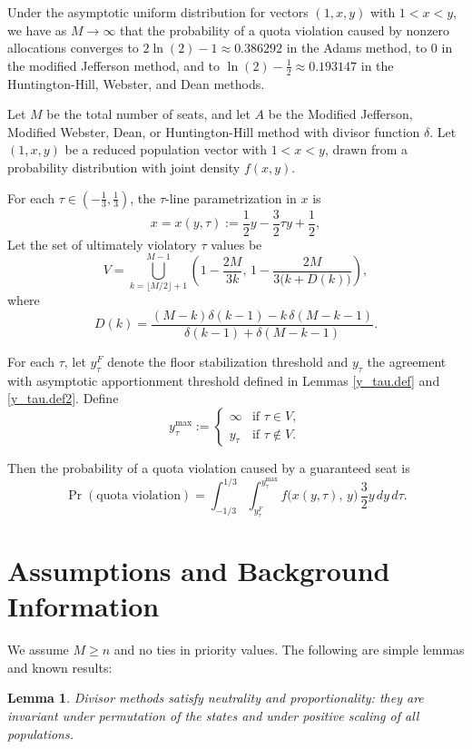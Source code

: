 \documentclass[11pt]{article}
\newtheorem{lemma}[theorem]{Lemma}
\theoremstyle{definition}
\theoremstyle{definition}
\newenvironment{customthm}[1]
  {\renewcommand\theinnercustomthm{#1}\innercustomthm}
  {\endinnercustomthm}
\begin{document}
\begin{customthm}{\ref{Mtoinftyproblimit}}
    Under the asymptotic uniform distribution for vectors $(1,x,y)$ with $1<x<y$, we have as $M \to \infty$ that the probability of a quota violation caused by nonzero allocations converges to $2 \ln(2) - 1 \approx 0.386292$ in the Adams method, to $0$ in the modified Jefferson method, and to $\ln(2) - \frac{1}{2} \approx 0.193147$ in the Huntington-Hill, Webster, and Dean methods.
\end{customthm}

\begin{customthm}{\ref{kitchen_sink}}
Let $M$ be the total number of seats, and let $A$ be the Modified Jefferson, Modified Webster, Dean, or Huntington-Hill method with divisor function $\delta$. Let $(1,x,y)$ be a reduced population vector with $1 < x < y$, drawn from a probability distribution with joint density $f(x,y)$.

For each $\tau \in \left(-\frac{1}{3},\frac{1}{3}\right)$, the $\tau$-line parametrization in $x$ is 
$$
x = x(y,\tau) := \frac{1}{2}y - \frac{3}{2}\tau y + \frac{1}{2},
$$
Let the set of ultimately violatory $\tau$ values be
$$
V = \bigcup_{k= \lfloor M/2 \rfloor + 1}^{M-1} 
\left( 1 - \frac{2M}{3k}, \, 1 - \frac{2M}{3\bigl(k + D(k)\bigr)} \right),
$$
where
$$
D(k) =\frac{(M-k)\delta(k-1)-k\,\delta(M-k-1)}{\delta(k-1)+\delta(M-k-1)}.
$$

For each $\tau$, let $y_\tau^F$ denote the floor stabilization threshold and $y_\tau$ the agreement with asymptotic apportionment threshold defined in Lemmas \ref{y_tau.def} and \ref{y_tau.def2}. Define
$$
y_\tau^{\max} :=
\begin{cases}
\infty & \text{if } \tau \in V,\\
y_\tau & \text{if } \tau \notin V.
\end{cases}
$$

Then the probability of a quota violation caused by a guaranteed seat is
$$
\Pr(\text{quota violation})
=
\int_{-1/3}^{1/3}
\int_{y_\tau^F}^{y_\tau^{\max}}
f\bigl(x(y,\tau),\,y\bigr)\,
\frac{3}{2}y
\, dy \, d\tau.
$$
\end{customthm}




\section{Assumptions and Background Information}
We assume $M \geq n$ and no ties in priority values. The following are simple lemmas and known results:
\begin{lemma}\parencite{b-young_textbook}\label{neutrality} Divisor methods satisfy neutrality and proportionality: they are invariant under permutation of the states and under positive scaling of all populations. \end{lemma}
\end{document}
